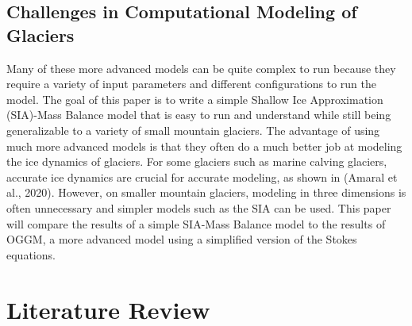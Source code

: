 \documentclass{article}
\begin{document}
\subsection{Challenges in Computational Modeling of Glaciers}
Many of these more advanced models can be quite complex to run because they require a variety of input parameters and different configurations to run the model. The 
goal of this paper is to write a simple Shallow Ice Approximation (SIA)-Mass Balance model that is easy to run and understand while still 
being generalizable to a variety of small mountain glaciers. The advantage of using much more advanced models is that they often do 
a much better job at modeling the ice dynamics of glaciers. For some glaciers such as marine calving glaciers, accurate ice dynamics are 
crucial for accurate modeling, as shown in (Amaral et al., 2020). However, on smaller mountain glaciers, modeling in three dimensions is often 
unnecessary and simpler models such as the SIA can be used. This paper will compare the results of a simple SIA-Mass Balance model to the 
results of OGGM, a more advanced model using a simplified version of the Stokes equations.

\section{Literature Review}
\end{document}
